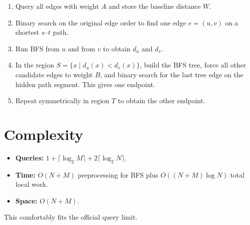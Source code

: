\documentclass[11pt,a4paper]{article}
\begin{document}
\begin{enumerate}
  \item Query all edges with weight $A$ and store the baseline distance $W$.
  \item Binary search on the original edge order to find one edge
        $e = (u, v)$ on a shortest $s$--$t$ path.
  \item Run BFS from $u$ and from $v$ to obtain $d_u$ and $d_v$.
  \item In the region $S = \{x \mid d_u(x) < d_v(x)\}$, build the BFS tree,
        force all other candidate edges to weight $B$, and binary search for
        the last tree edge on the hidden path segment. This gives one endpoint.
  \item Repeat symmetrically in region $T$ to obtain the other endpoint.
\end{enumerate}

\section{Complexity}

\begin{itemize}
  \item \textbf{Queries:} $1 + \lceil \log_2 M \rceil + 2\lceil \log_2 N \rceil$.
  \item \textbf{Time:} $O(N + M)$ preprocessing for BFS plus
        $O((N + M)\log N)$ total local work.
  \item \textbf{Space:} $O(N + M)$.
\end{itemize}

This comfortably fits the official query limit.
\end{document}
